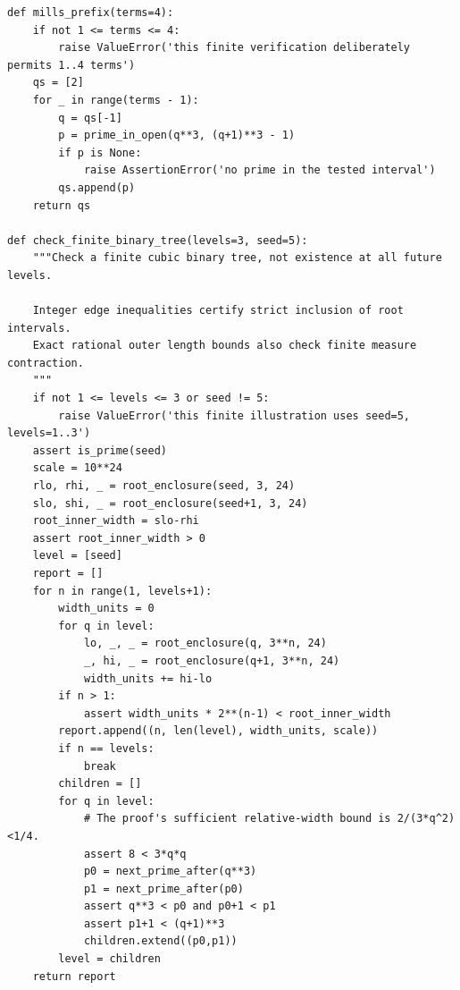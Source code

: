 \documentclass[11pt,reqno]{amsart}
\theoremstyle{blueplain}
\newcounter{asser}
\numberwithin{equation}{section}
\begin{document}
\begin{lstlisting}[style=python,basicstyle=\ttfamily\scriptsize,numberstyle=\scriptsize]
def mills_prefix(terms=4):
    if not 1 <= terms <= 4:
        raise ValueError('this finite verification deliberately permits 1..4 terms')
    qs = [2]
    for _ in range(terms - 1):
        q = qs[-1]
        p = prime_in_open(q**3, (q+1)**3 - 1)
        if p is None:
            raise AssertionError('no prime in the tested interval')
        qs.append(p)
    return qs

def check_finite_binary_tree(levels=3, seed=5):
    """Check a finite cubic binary tree, not existence at all future levels.

    Integer edge inequalities certify strict inclusion of root intervals.
    Exact rational outer length bounds also check finite measure contraction.
    """
    if not 1 <= levels <= 3 or seed != 5:
        raise ValueError('this finite illustration uses seed=5, levels=1..3')
    assert is_prime(seed)
    scale = 10**24
    rlo, rhi, _ = root_enclosure(seed, 3, 24)
    slo, shi, _ = root_enclosure(seed+1, 3, 24)
    root_inner_width = slo-rhi
    assert root_inner_width > 0
    level = [seed]
    report = []
    for n in range(1, levels+1):
        width_units = 0
        for q in level:
            lo, _, _ = root_enclosure(q, 3**n, 24)
            _, hi, _ = root_enclosure(q+1, 3**n, 24)
            width_units += hi-lo
        if n > 1:
            assert width_units * 2**(n-1) < root_inner_width
        report.append((n, len(level), width_units, scale))
        if n == levels:
            break
        children = []
        for q in level:
            # The proof's sufficient relative-width bound is 2/(3*q^2)<1/4.
            assert 8 < 3*q*q
            p0 = next_prime_after(q**3)
            p1 = next_prime_after(p0)
            assert q**3 < p0 and p0+1 < p1
            assert p1+1 < (q+1)**3
            children.extend((p0,p1))
        level = children
    return report


\end{lstlisting}
\end{document}
